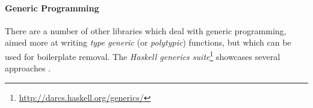 \paragraph{Generic Programming} There are a number of other libraries which deal with generic programming, aimed more at writing \textit{type generic} (or \textit{polytypic}) functions, but which can be used for boilerplate removal. The \textit{Haskell generics suite}\footnote{\url{http://darcs.haskell.org/generics/}} showcases several approaches \citep{weirich:replib,hinze:generics_masses,hinze:generic_haskell}.

